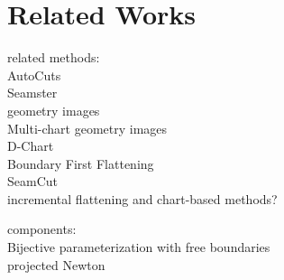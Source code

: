 \section{Related Works}

related methods:\\
AutoCuts~\cite{Poranne2017Autocuts}\\
Seamster~\cite{Sheffer2002Seamster}\\
geometry images~\cite{Gu2002Geometry}\\
Multi-chart geometry images~\cite{Snyder2003Multi}\\
D-Chart~\cite{Julius2005D}\\
Boundary First Flattening~\cite{Sawhney:2017}\\
SeamCut~\cite{Lucquin:2017}\\

incremental flattening and chart-based methods?

components:\\
Bijective parameterization with free boundaries~\cite{Smith2015Bijective}\\
projected Newton~\cite{Teran2005Robust}\\
\\